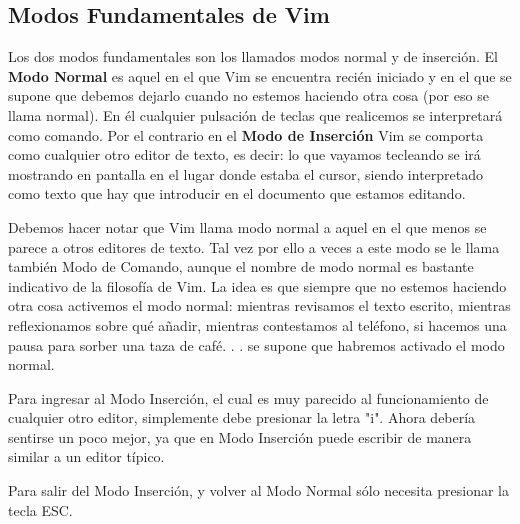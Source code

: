 \subsection{Modos Fundamentales de Vim}

Los dos modos fundamentales son los llamados modos normal y de inserción. 
El \textbf{Modo Normal} es aquel
en el que Vim se encuentra recién iniciado y en el que se supone que debemos
dejarlo cuando no estemos haciendo otra cosa (por eso se llama normal). En él
cualquier pulsación de teclas que realicemos se interpretará como comando. Por
el contrario en el \textbf{Modo de Inserción} Vim se comporta como cualquier
otro editor de texto, es decir: lo que vayamos tecleando se irá mostrando en
pantalla en el lugar donde estaba el cursor, siendo interpretado como texto que
hay que introducir en el documento que estamos editando.

Debemos hacer notar que Vim llama modo normal a aquel en el que menos se
parece a otros editores de texto. Tal vez por ello a veces a este modo se le
llama también Modo de Comando, aunque el nombre de modo normal es bastante
indicativo de la filosofía de Vim. La idea es que siempre que no estemos
haciendo otra cosa activemos el modo normal: mientras revisamos el texto
escrito, mientras reflexionamos sobre qué añadir, mientras contestamos al
teléfono, si hacemos una pausa para sorber una taza de café. . . 
se supone que habremos activado el modo normal.

Para ingresar al Modo Inserción, el cual es muy parecido al funcionamiento
de cualquier otro editor, simplemente debe presionar la letra "i".
Ahora debería sentirse un poco mejor, ya que en Modo Inserción puede
escribir de manera similar a un editor típico.

Para salir del Modo Inserción, y volver al Modo Normal sólo necesita
presionar la tecla ESC.



